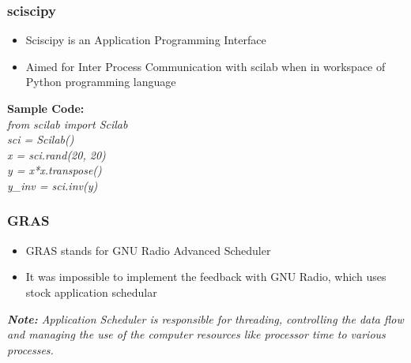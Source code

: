 \documentclass{beamer}
\begin{document}
\begin{frame}
	\frametitle{sciscipy}
	\begin{itemize}
		\item Sciscipy is an Application Programming Interface 
		\item Aimed for Inter Process Communication with scilab when in workspace of Python programming language
	\end{itemize}
	\textbf{Sample Code:}\\ 
	\textit{from scilab import Scilab 
                \\  sci = Scilab()
                \\  x = sci.rand(20, 20)
                \\  y = x*x.transpose()
                \\  y\_inv = sci.inv(y)}
\end{frame}

\begin{frame}
        \frametitle{GRAS}
        \begin{itemize}
		\item GRAS stands for GNU Radio Advanced Scheduler
		\item It was impossible to implement the feedback with GNU Radio, which uses stock application schedular \newline 
        \end{itemize}
\textit{\textbf{Note:} Application Scheduler is responsible for threading, controlling the data flow and managing the use of the computer resources like processor time to various processes.}

\end{frame}
\end{document}

